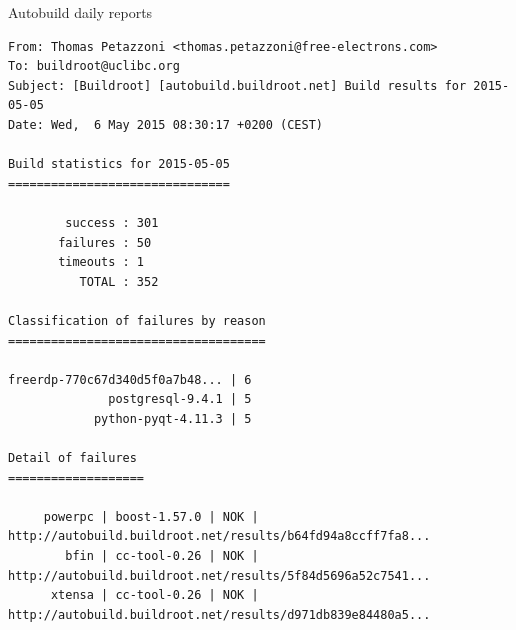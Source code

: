 \begin{frame}[fragile]{Autobuild daily reports}

{\tiny
\begin{verbatim}
From: Thomas Petazzoni <thomas.petazzoni@free-electrons.com>
To: buildroot@uclibc.org
Subject: [Buildroot] [autobuild.buildroot.net] Build results for 2015-05-05
Date: Wed,  6 May 2015 08:30:17 +0200 (CEST)

Build statistics for 2015-05-05
===============================

        success : 301
       failures : 50 
       timeouts : 1  
          TOTAL : 352

Classification of failures by reason
====================================

freerdp-770c67d340d5f0a7b48... | 6 
              postgresql-9.4.1 | 5 
            python-pyqt-4.11.3 | 5 

Detail of failures
===================

     powerpc | boost-1.57.0 | NOK | http://autobuild.buildroot.net/results/b64fd94a8ccff7fa8...
        bfin | cc-tool-0.26 | NOK | http://autobuild.buildroot.net/results/5f84d5696a52c7541...
      xtensa | cc-tool-0.26 | NOK | http://autobuild.buildroot.net/results/d971db839e84480a5...
\end{verbatim}}

\end{frame}